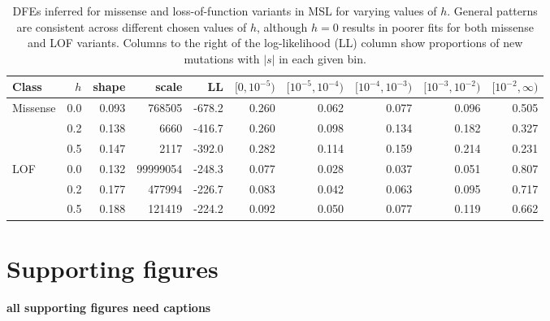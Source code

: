 \documentclass[]{article}
\begin{document}
\begin{table}
    \centering
    \small
    \begin{tabular}{lrrrrrrrrr}
        \toprule
        Class & $h$ & shape & scale & LL &
        $[0,10^{-5})$ & $[10^{-5},10^{-4})$ & $[10^{-4},10^{-3})$ &
        $[10^{-3},10^{-2})$ & $[10^{-2},\infty)$\\
        \midrule
        Missense & 0.0 & 0.093 & 768505 & -678.2 & 0.260 & 0.062 & 0.077 & 0.096 & 0.505\\
         & 0.2 & 0.138 & 6660 & -416.7 & 0.260 & 0.098 & 0.134 & 0.182 & 0.327\\
         & 0.5 & 0.147 & 2117 & -392.0 & 0.282 & 0.114 & 0.159 & 0.214 & 0.231\\
        \addlinespace
        LOF & 0.0 & 0.132 & 99999054 & -248.3 & 0.077 & 0.028 & 0.037 & 0.051 & 0.807\\
         & 0.2 & 0.177 & 477994 & -226.7 & 0.083 & 0.042 & 0.063 & 0.095 & 0.717\\
         & 0.5 & 0.188 & 121419 & -224.2 & 0.092 & 0.050 & 0.077 & 0.119 & 0.662\\
        \bottomrule
    \end{tabular}
    \caption{
        DFEs inferred for missense and loss-of-function variants in MSL for varying
        values of $h$. General patterns are consistent across different chosen values
        of $h$, although $h=0$ results in poorer fits for both missense and LOF variants.
        Columns to the right of the log-likelihood (LL) column show proportions of
        new mutations with $|s|$ in each given bin.
    }
    \label{tab:msldfe}
\end{table}

\clearpage
\newpage

\section{Supporting figures}

\textbf{all supporting figures need captions}
\end{document}
